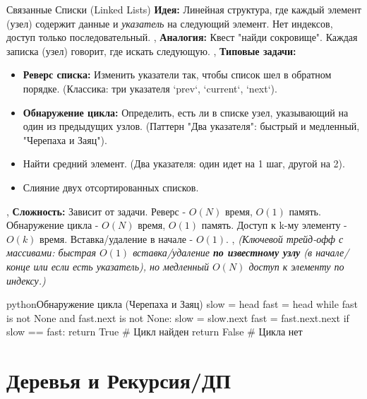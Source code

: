 \begin{myblock}{Связанные Списки (Linked Lists)}
    \textbf{Идея:} Линейная структура, где каждый элемент (узел) содержит данные и \textit{указатель} на следующий элемент. Нет индексов, доступ только последовательный. \sep
    \textbf{Аналогия:} Квест "найди сокровище". Каждая записка (узел) говорит, где искать следующую. \sep
    \textbf{Типовые задачи:}
    \begin{itemize}[nosep, leftmargin=*]
        \item \textbf{Реверс списка:} Изменить указатели так, чтобы список шел в обратном порядке. (Классика: три указателя `prev`, `current`, `next`).
        \item \textbf{Обнаружение цикла:} Определить, есть ли в списке узел, указывающий на один из предыдущих узлов. (Паттерн "Два указателя": быстрый и медленный, "Черепаха и Заяц").
        \item Найти средний элемент. (Два указателя: один идет на 1 шаг, другой на 2).
        \item Слияние двух отсортированных списков.
    \end{itemize} \sep
    \textbf{Сложность:} Зависит от задачи. Реверс - \textbf{$O(N)$} время, \textbf{$O(1)$} память. Обнаружение цикла - \textbf{$O(N)$} время, \textbf{$O(1)$} память. Доступ к k-му элементу - \textbf{$O(k)$} время. Вставка/удаление в начале - \textbf{$O(1)$}. \sep %
    \textit{(Ключевой трейд-офф с массивами: быстрая $O(1)$ вставка/удаление \textbf{по известному узлу} (в начале/конце или если есть указатель), но медленный $O(N)$ доступ к элементу по индексу.)}
    \begin{codebox}{python}{Обнаружение цикла (Черепаха и Заяц)}
    slow = head
    fast = head
    while fast is not None and fast.next is not None:
        slow = slow.next
        fast = fast.next.next
        if slow == fast:
            return True # Цикл найден
    return False # Цикла нет
    \end{codebox}
\end{myblock}

\section{Деревья и Рекурсия/ДП}

